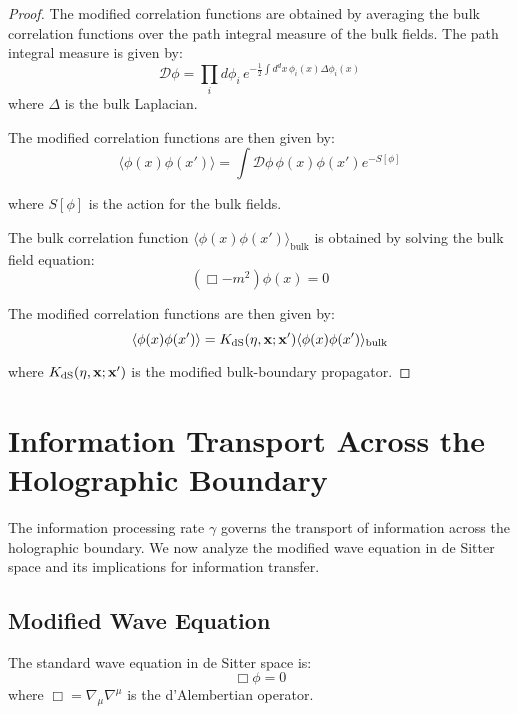 \documentclass[11pt,english,twoside]{article}
\theoremstyle{plain}
\theoremstyle{definition}
\theoremstyle{remark}
\newcommand{\dS}{{\rm dS}}
\newcommand{\gammaR}{\gamma}
\newcommand{\xb}{\mathbf{x}}
\begin{document}
\begin{proof}
The modified correlation functions are obtained by averaging the bulk correlation functions over the path integral measure of the bulk fields. The path integral measure is given by:
\begin{equation}
\mathcal{D}\phi = \prod_{i} d\phi_i \, e^{-\frac{1}{2}\int d^dx \, \phi_i(x) \Delta \phi_i(x)}
\end{equation}
where $\Delta$ is the bulk Laplacian.

The modified correlation functions are then given by:
\begin{equation}
\langle \phi(x) \phi(x') \rangle = \int \mathcal{D}\phi \, \phi(x) \phi(x') e^{-S[\phi]}
\end{equation}

where $S[\phi]$ is the action for the bulk fields.

The bulk correlation function $\langle \phi(x) \phi(x') \rangle_{\text{bulk}}$ is obtained by solving the bulk field equation:
\begin{equation}
(\Box - m^2)\phi(x) = 0
\end{equation}

The modified correlation functions are then given by:
\begin{equation}
\langle \phi(x) \phi(x') \rangle = K_{\dS}(\eta,\xb;\xb') \langle \phi(x) \phi(x') \rangle_{\text{bulk}}
\end{equation}

where $K_{\dS}(\eta,\xb;\xb')$ is the modified bulk-boundary propagator.
\end{proof}

\section{Information Transport Across the Holographic Boundary}
\label{sec:info_transport}

The information processing rate $\gammaR$ governs the transport of information across the holographic boundary. We now analyze the modified wave equation in de Sitter space and its implications for information transfer.

\subsection{Modified Wave Equation}
\label{subsec:modified_wave}

The standard wave equation in de Sitter space is:
\begin{equation}
\label{eq:wave_standard}
\Box \phi = 0
\end{equation}
where $\Box = \nabla_\mu \nabla^\mu$ is the d'Alembertian operator.
\end{document}
